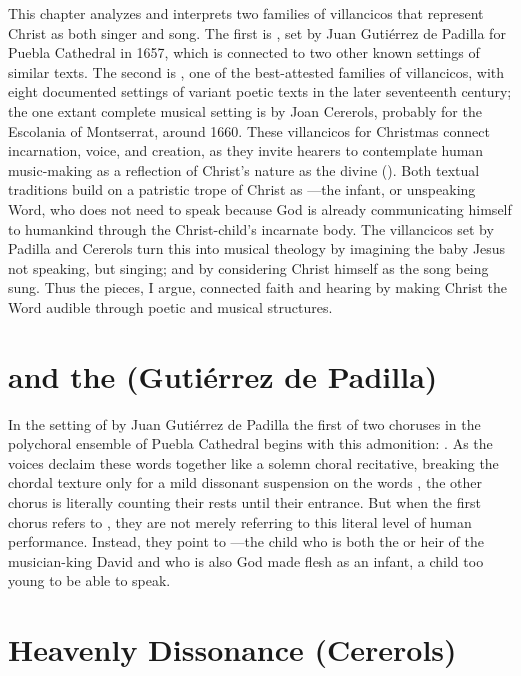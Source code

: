 This chapter analyzes and interprets two families of villancicos that represent
Christ as both singer and song.
The first is , set by Juan Gutiérrez de Padilla
for Puebla Cathedral in 1657, which is connected to two other known settings of
similar texts.
The second is , one of the
best-attested families of villancicos, with eight documented settings of variant
poetic texts in the later seventeenth century; the one extant complete musical
setting is by Joan Cererols, probably for the Escolania of Montserrat, around
1660.
These villancicos for Christmas connect incarnation, voice, and creation, as
they invite hearers to contemplate human music-making as a reflection of
Christ's nature as the divine  ().
Both textual traditions build on a patristic trope of Christ as
---the infant, or unspeaking Word, who does not need to
speak because God is already communicating himself to humankind through the
Christ-child's incarnate body.
The villancicos set by Padilla and Cererols turn this into musical theology by
imagining the baby Jesus not speaking, but singing; and by considering Christ
himself as the song being sung.
Thus the pieces, I argue, connected faith and hearing by making Christ the Word
audible through poetic and musical structures.

\section{ and the 
(Gutiérrez de Padilla)}

In the setting of  by Juan Gutiérrez de Padilla
the first of two choruses in the polychoral ensemble of Puebla Cathedral begins
with this admonition: .
As the voices declaim these words together like a solemn choral recitative, 
breaking the chordal texture only for a mild dissonant suspension on the words
, the other chorus is literally counting their
\XXX[number of] rests until their entrance.
But when the first chorus refers to , they are not merely
referring to this literal level of human performance.
Instead, they point to ---the child who is both
the  or heir of the musician-king David and who is also God made
flesh as an infant, a child too young to be able to speak.




\section{Heavenly Dissonance (Cererols)}


